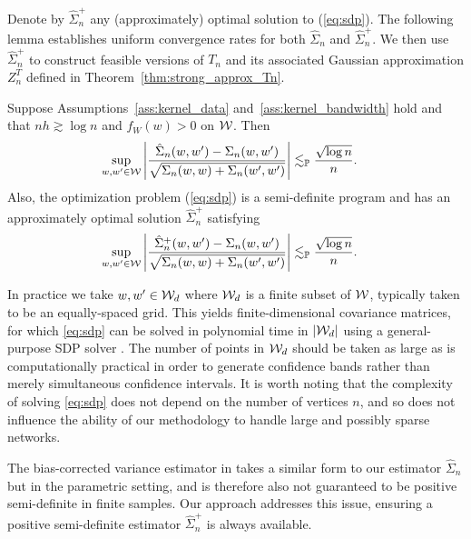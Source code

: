 Denote by $\hat\Sigma_n^+$ any (approximately) optimal solution to
(\ref{eq:sdp}). The following lemma establishes uniform convergence rates
for both $\hat \Sigma_n$ and $\hat \Sigma_n^+$.
We then use $\hat \Sigma_n^+$ to construct feasible versions of $T_n$ and its
associated Gaussian approximation $Z_n^{T}$ defined in
Theorem~\ref{thm:strong_approx_Tn}.
%
\begin{lemma}
  \label{lem:sdp}
  Suppose Assumptions~\ref{ass:kernel_data} and~\ref{ass:kernel_bandwidth} hold
  and that $n h \gtrsim \log n$ and $f_W(w) > 0$ on $\mathcal{W}$. Then
  \begin{align*}
    \sup_{w,w' \in \mathcal{W}}
    \left| \frac{\hat \Sigma_n(w,w') - \Sigma_n(w,w')}
    {\sqrt{\Sigma_n(w,w) + \Sigma_n(w',w')}} \right|
    &\lesssim_{\mathbb{P}} \frac{\sqrt{\log n}}{n}.
  \end{align*}
  Also, the optimization problem (\ref{eq:sdp}) is a semi-definite program
  \citep[SDP,][]{laurent2005semidefinite} and has an approximately optimal
  solution $\hat\Sigma_n^+$ satisfying
  \begin{align*}
    \sup_{w,w' \in \mathcal{W}} \left|
    \frac{\hat \Sigma_n^+(w,w') - \Sigma_n(w,w')}
    {\sqrt{\Sigma_n(w,w) + \Sigma_n(w',w')}} \right|
    &\lesssim_{\mathbb{P}} \frac{\sqrt{\log n}}{n}.
  \end{align*}
\end{lemma}

In practice we take $w, w' \in \mathcal{W}_d$ where $\mathcal{W}_d$ is a finite subset of
$\mathcal{W}$, typically taken to be an equally-spaced grid. This yields
finite-dimensional covariance matrices, for which \eqref{eq:sdp} can be solved
in polynomial time in $|\mathcal{W}_d|$ using a general-purpose SDP solver
\citep[e.g.\ by interior point methods,][]{laurent2005semidefinite}.
The number of points in $\mathcal{W}_d$ should be taken as large as is computationally
practical in order to generate confidence bands rather than merely simultaneous
confidence intervals. It is worth noting that the complexity of solving
\eqref{eq:sdp} does not depend on the number of vertices $n$, and so does not
influence the ability of our methodology to handle large and possibly sparse
networks.

The bias-corrected variance estimator in
\citet[Section~3.2]{matsushita2021jackknife} takes a similar form to our
estimator
$\hat\Sigma_n$ but in the parametric setting, and is therefore also not
guaranteed to be positive semi-definite in finite samples. Our approach
addresses this issue, ensuring a positive semi-definite estimator
$\hat\Sigma_n^+$ is always available.

